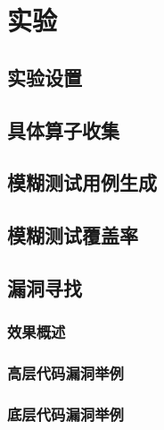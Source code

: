 
\chapter{实验}



\section{实验设置}


\section{具体算子收集}


\section{模糊测试用例生成}


\section{模糊测试覆盖率}


\section{漏洞寻找}

\subsection{效果概述}


\subsection{高层代码漏洞举例}


\subsection{底层代码漏洞举例}



